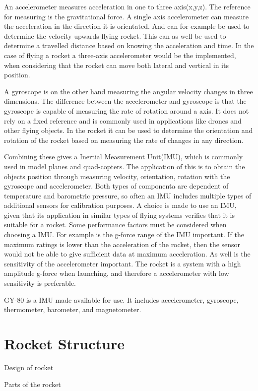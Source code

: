 An accelerometer measures acceleration in one to three axis(x,y,z). The reference for measuring is the gravitational force. A single axis accelerometer can measure the acceleration in the direction it is orientated. And can for example be used to determine the velocity upwards flying rocket. This can as well be used to determine a travelled distance based on knowing the acceleration and time. In the case of flying a rocket a three-axis accelerometer would be the implemented, when considering that the rocket can move both lateral and vertical in its position.  


A gyroscope is on the other hand measuring the angular velocity changes in three dimensions. The difference between the accelerometer and gyroscope is that the gyroscope is capable of measuring the rate of rotation around a axis. It does not rely on a fixed reference and is commonly used in applications like drones and other flying objects. In the rocket it can be used to determine the orientation and rotation of the rocket based on measuring the rate of changes in any direction.  


Combining these gives a Inertial Measurement Unit(IMU), which is commonly used in model planes and quad-copters. The application of this is to obtain the objects position through measuring velocity, orientation, rotation with the gyroscope and accelerometer. Both types of componenta are dependent of temperature and barometric pressure, so often an IMU includes multiple types of additional sensors for calibration purposes. A choice is made to use an IMU, given that its application in similar types of flying systems verifies that it is suitable for a rocket.    	  
Some performance factors must be considered when choosing a IMU. For example is the g-force range of the IMU important. If the maximum ratings is lower than the acceleration of the rocket, then the sensor would not be able to give sufficient data at maximum acceleration. As well is the sensitivity of the accelerometer important. The rocket is a system with a high amplitude g-force when launching, and therefore a accelerometer with low sensitivity is preferable.

GY-80 is a IMU made available for use. It includes accelerometer, gyroscope, thermometer, barometer, and magnetometer. 


\section{Rocket Structure}
Design of rocket

Parts of the rocket 


